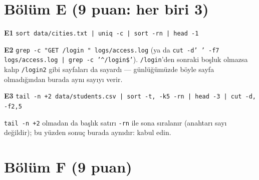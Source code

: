 \documentclass[11pt,a4paper]{article}
\begin{document}
\section*{Bölüm E (9 puan: her biri 3)}
\textbf{E1} \texttt{sort data/cities.txt | uniq -c | sort -rn | head -1}

\textbf{E2} \texttt{grep -c "GET /login " logs/access.log} (ya da \texttt{cut -d' ' -f7 logs/access.log | grep -c '\^{}/login\$'}). \texttt{/login}'den sonraki boşluk olmazsa kalıp \texttt{/login2} gibi sayfaları da sayardı --- günlüğümüzde böyle sayfa olmadığından burada aynı sayıyı verir.

\textbf{E3} \texttt{tail -n +2 data/students.csv | sort -t, -k5 -rn | head -3 | cut -d, -f2,5}

\texttt{tail -n +2} olmadan da başlık satırı \texttt{-rn} ile sona sıralanır (anahtarı sayı değildir); bu yüzden sonuç burada aynıdır: kabul edin.

\section*{Bölüm F (9 puan)}


\end{document}
